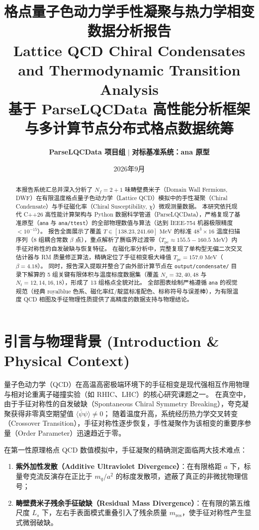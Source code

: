 \documentclass[11pt,a4paper]{ctexart}
\title{\vspace{-1.2cm}
    \LARGE \textbf{\textcolor{themeblue}{格点量子色动力学手性凝聚与热力学相变数据分析报告}} \\
    \vspace{0.35cm}
    \large \textbf{Lattice QCD Chiral Condensates and Thermodynamic Transition Analysis} \\
    \vspace{0.2cm}
    \normalsize \textcolor{themegray}{基于 ParseLQCData 高性能分析框架与多计算节点分布式格点数据统筹}
}
\author{\textbf{ParseLQCData 项目组} \quad $\vert$ \quad \textbf{对标基准系统：ana 原型}}
\date{2026年9月}
\begin{document}
\maketitle
\thispagestyle{fancy}

\begin{abstract}
\noindent
本报告系统汇总并深入分析了 $N_f = 2+1$ 味畴壁费米子（Domain Wall Fermions, DWF）在有限温度格点量子色动力学（Lattice QCD）模拟中的手性凝聚（Chiral Condensate）与手征磁化率（Chiral Susceptibility, $\chi$）微观测量数据。
本研究依托现代 C++26 高性能计算架构与 Python 数据科学管道（ParseLQCData），严格复现了基准原型（\texttt{ana} 与 \texttt{ana/ttest}）的全部物理数值与算法（达到 IEEE-754 机器极限精度 $< 10^{-15}$）。
报告全面展示了覆盖 $T \in [138.23, 241.60]\text{ MeV}$ 的标准 $48^3 \times 16$ 温度扫描序列（8 组耦合常数 $\beta$ 点），重点解析了赝临界过渡带（$T_{\text{pc}} \approx 155.5 - 160.5\text{ MeV}$）内手征对称性的自发破缺与恢复特征。
在磁化率分析中，完整复现了单构型无偏二次交叉估计器与 RM 质量修正算法，精确定位了手征相变极大峰值 $T_{\text{pc}} = 157.0\text{ MeV}$（$\beta=4.18$）。
同时，报告深入提取并整合了由外部计算节点在 \texttt{output/condensate/} 目录下解算的 5 组关键有限体积与温度标度数据集（覆盖 $N_s = 32, 40, 48$ 与 $N_t = 12, 14, 16, 18$），形成了 13 组格点全貌对比。
全部图表绘制严格遵循 \texttt{ana} 的视觉规范（经典 royalblue 色系、磁化率红/靛蓝标准配色、标称符号与误差棒），为有限温度 QCD 相图及手征物理性质提供了高精度的数据支持与物理结论。
\end{abstract}


\vspace{0.2cm}
\tableofcontents
\vspace{0.4cm}

\section{引言与物理背景 (Introduction \& Physical Context)}

量子色动力学（QCD）在高温高密极端环境下的手征相变是现代强相互作用物理与相对论重离子碰撞实验（如 RHIC、LHC）的核心研究课题之一。
在真空中，由于手征对称性的自发破缺（Spontaneous Chiral Symmetry Breaking），夸克凝聚获得非零真空期望值 $\langle\bar{\psi}\psi\rangle \neq 0$；
随着温度升高，系统经历热力学交叉转变（Crossover Transition），手征对称性逐步恢复，手性凝聚作为该相变的重要序参量（Order Parameter）迅速趋近于零。

在第一性原理格点 QCD 数值模拟中，手征凝聚的精确测定面临两大技术难点：
\begin{enumerate}
    \item \textbf{紫外加性发散（Additive Ultraviolet Divergence）}：在有限格距 $a$ 下，标量夸克流反演存在正比于 $m_q / a^2$ 的标度发散项，遮蔽了真正的非微扰物理信号；
    \item \textbf{畴壁费米子残余手征破缺（Residual Mass Divergence）}：在有限的第五维尺度 $L_s$ 下，左右手表面模式重叠引入了残余质量 $m_{\text{res}}$，使手征对称性产生显式微弱破缺。
\end{enumerate}
\end{document}
